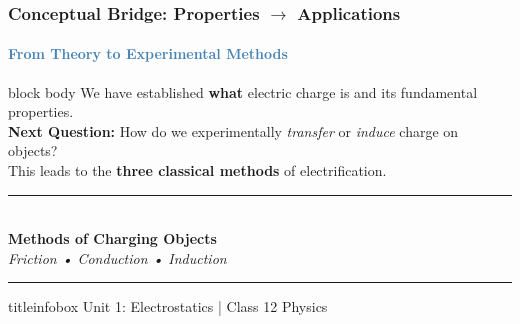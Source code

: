 \begin{frame}
\frametitle{\textsf{\textbf{Conceptual Bridge:} Properties $\rightarrow$ Applications}}
\framesubtitle{\textcolor{steelblue}{From Theory to Experimental Methods}}

\vspace{0.2cm}

\begin{center}
\begin{beamercolorbox}[wd=0.95\textwidth,rounded=true,shadow=true]{block body}
\vspace{0.3cm}
\large
{}\quad We have established \textbf{what} electric charge is and its fundamental properties.\\[0.3cm]
\quad \textbf{Next Question:} How do we experimentally \textit{transfer} or \textit{induce} charge on objects?\\[0.3cm]
\quad This leads to the \textbf{three classical methods} of electrification.
\vspace{0.3cm}
\end{beamercolorbox}
\end{center}

\vspace{0.3cm}

\begin{center}
{\color{deepnavy}\rule{0.8\textwidth}{2pt}}\\[0.2cm]
{\Large\textsf{\textbf{Methods of Charging Objects}}}\\[0.1cm]
{\color{steelblue}\textit{Friction • Conduction • Induction}}\\
{\color{deepnavy}\rule{0.8\textwidth}{2pt}}
\end{center}

\vfill

\begin{beamercolorbox}[wd=\textwidth,ht=0.5cm,dp=0.1cm,center]{titleinfobox}
    \small\color{coolgray} Unit 1: Electrostatics | Class 12 Physics
\end{beamercolorbox}
\end{frame}


